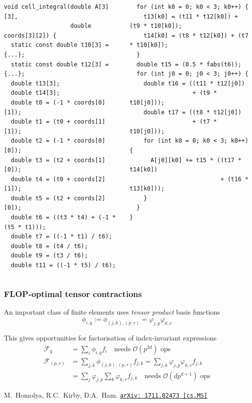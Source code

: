 \documentclass[presentation]{beamer}
\newcommand{\arxivlink}[2]{%
  \href{http://www.arxiv.org/abs/#1}%
  {\texttt{arXiv:\,#1\,[#2]}}%
}
\begin{document}
\begin{frame}[fragile]
\begin{overlayarea}{\textwidth}{0.8\textheight}
\begin{onlyenv}
\begin{columns}
      \begin{column}{0.5\textwidth}
\begin{verbatim}
void cell_integral(double A[3][3],
                   double coords[3][2]) {
  static const double t10[3] = {...};
  static const double t12[3] = {...};
  double t13[3];
  double t14[3];
  double t0 = (-1 * coords[0][1]);
  double t1 = (t0 + coords[1][1]);
  double t2 = (-1 * coords[0][0]);
  double t3 = (t2 + coords[1][0]);
  double t4 = (t0 + coords[2][1]);
  double t5 = (t2 + coords[2][0]);
  double t6 = ((t3 * t4) + (-1 * (t5 * t1)));
  double t7 = ((-1 * t1) / t6);
  double t8 = (t4 / t6);
  double t9 = (t3 / t6);
  double t11 = ((-1 * t5) / t6);
\end{verbatim}
      \end{column}
      \begin{column}{0.5\textwidth}
\begin{verbatim}
  for (int k0 = 0; k0 < 3; k0++) {
    t13[k0] = (t11 * t12[k0]) + (t9 * t10[k0]);
    t14[k0] = (t8 * t12[k0]) + (t7 * t10[k0]);
  }
  double t15 = (0.5 * fabs(t6));
  for (int j0 = 0; j0 < 3; j0++) {
    double t16 = ((t11 * t12[j0])
                  + (t9 * t10[j0]));
    double t17 = ((t8 * t12[j0])
                  + (t7 * t10[j0]));
    for (int k0 = 0; k0 < 3; k0++) {
      A[j0][k0] += t15 * ((t17 * t14[k0])
                          + (t16 * t13[k0]));
    }
  }
}
\end{verbatim}
      \end{column}
    \end{columns}
  \end{onlyenv}
  \end{overlayarea}
\end{frame}

\begin{frame}
  \frametitle{FLOP-optimal tensor contractions}
  An important class of finite elements uses \emph{tensor product}
  basis functions
  \begin{equation*}
    \phi_{i,q} := \phi_{(j,k),(p,r)} = \varphi_{j,p}\varphi_{k,r}
  \end{equation*}

  This gives opportunities for factorisation of index-invariant
  expressions
  \begin{align*}
    \mathcal{F}_q &= \sum_i \phi_{i,q} f_i  \quad \text{needs
                    $\mathcal{O}(p^{2d})$ ops}\\
    \mathcal{F}_{(p,r)} &= \sum_{j,k} \phi_{(j,k),(p,r)} f_{j,k} = \sum_{j,k} \varphi_{j,p}\varphi_{k,r} f_{j,k} \\
                        &= \sum_j \varphi_{j,p} \sum_k \varphi_{k,r}
                          f_{j,k} \quad \text{needs
                          $\mathcal{O}(dp^{d+1})$ ops}
  \end{align*}
  \begin{flushright}
    {\scriptsize M.~Homolya, R.C.~Kirby, D.A.~Ham. \arxivlink{1711.02473}{cs.MS}}
  \end{flushright}
\end{frame}
\end{document}
